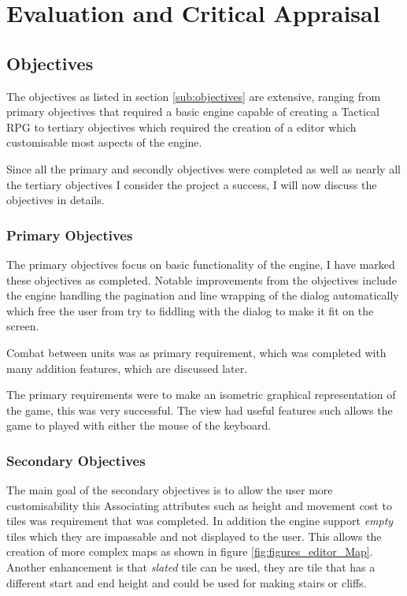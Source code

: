 \section{Evaluation and Critical Appraisal}

\subsection{Objectives}
\label{sub:eobjectives}
The objectives as listed in section \ref{sub:objectives}  are extensive, ranging from primary objectives that required a basic engine capable of creating a Tactical RPG to tertiary objectives which required the creation of a editor which customisable most aspects of the  engine. 

Since all the primary and secondly objectives were completed as well as nearly all the tertiary objectives I consider  the project a success, I will now discuss the objectives in details.

\subsubsection{Primary Objectives}

The primary objectives focus on basic functionality of the engine, I have marked these objectives as completed. Notable improvements from the objectives include the engine handling the pagination and line wrapping of the dialog automatically which free the user from try to fiddling with the dialog to make it fit on the screen. 

Combat between units was as primary requirement, which was completed with many addition features, which are discussed later.

The primary requirements were to make an isometric graphical representation of the game, this was very successful. The view had useful features such allows the game to played with either the mouse of the keyboard.

\subsubsection{Secondary Objectives}
The main goal of the secondary objectives is to allow the user more customisability this   Associating attributes such as height and movement cost to tiles was requirement that was completed. In addition the engine support \emph{empty} tiles which they are impassable and not displayed to the user. This allows the creation of more complex maps as shown in figure \ref{fig:figures_editor_Map}. Another enhancement is that \emph{slated} tile can be used, they are tile that has a different start and end height and could be used for making stairs or cliffs. 


